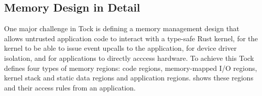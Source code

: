 

%

\subsection{\name Memory Design in Detail}

One major challenge in Tock is defining a memory management design
that allows untrusted application code 
to interact with a type-safe Rust kernel, for the kernel to be able to
issue event upcalls to the application, for device driver isolation, and 
for applications to directly
acccess hardware. To achieve this
Tock defines four types of memory regions: code regions, 
memory-mapped I/O regions,
kernel stack and static data regions and application regions.
 shows these regions and their access rules from
an application.

